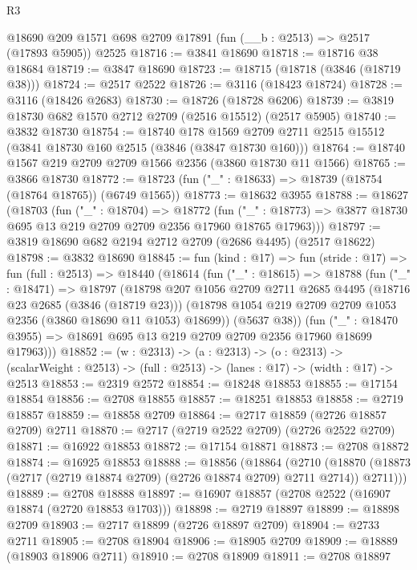\begin{lexlean}{R3}
\begin{coremodule}
    @18690
    @209
    @1571
    @698
    @2709
    @17891
    (fun (__b : @2513) => @2517 (@17893 @5905))
    @2525
@18716 := @3841 @18690
@18718 := @18716 @38 @18684
@18719 := @3847 @18690
@18723 := @18715 (@18718 (@3846 (@18719 @38)))
@18724 := @2517 @2522
@18726 := @3116 (@18423 @18724)
@18728 := @3116 (@18426 @2683)
@18730 := @18726 (@18728 @6206)
@18739 := @3819 @18730 @682 @1570 @2712 @2709 (@2516 @15512) (@2517 @5905)
@18740 := @3832 @18730
@18754 := @18740
    @178
    @1569
    @2709
    @2711
    @2515
    @15512
    (@3841 @18730 @160 @2515 (@3846 (@3847 @18730 @160)))
@18764 := @18740 @1567 @219 @2709 @2709 @1566 @2356 (@3860 @18730 @11 @1566)
@18765 := @3866 @18730
@18772 := @18723 (fun ("_" : @18633) => @18739 (@18754 (@18764 @18765)) (@6749 @1565))
@18773 := @18632 @3955
@18788 := @18627
    (@18703
      (fun ("_" : @18704) =>
      @18772
        (fun ("_" : @18773) => @3877 @18730 @695 @13 @219 @2709 @2709 @2356 @17960 @18765 @17963)))
@18797 := @3819 @18690 @682 @2194 @2712 @2709 (@2686 @4495) (@2517 @18622)
@18798 := @3832 @18690
@18845 := fun (kind : @17) =>
  fun (stride : @17) =>
  fun (full : @2513) =>
  @18440
    (@18614
      (fun ("_" : @18615) =>
      @18788
        (fun ("_" : @18471) =>
        @18797
          (@18798
            @207
            @1056
            @2709
            @2711
            @2685
            @4495
            (@18716 @23 @2685 (@3846 (@18719 @23)))
            (@18798 @1054 @219 @2709 @2709 @1053 @2356 (@3860 @18690 @11 @1053) @18699))
          (@5637 @38))
        (fun ("_" : @18470 @3955) => @18691 @695 @13 @219 @2709 @2709 @2356 @17960 @18699 @17963)))
@18852 := (w : @2313) ->
  (a : @2313) ->
  (o : @2313) -> (scalarWeight : @2513) -> (full : @2513) -> (lanes : @17) -> (width : @17) -> @2513
@18853 := @2319 @2572
@18854 := @18248 @18853
@18855 := @17154 @18854
@18856 := @2708 @18855
@18857 := @18251 @18853
@18858 := @2719 @18857
@18859 := @18858 @2709
@18864 := @2717 @18859 (@2726 @18857 @2709) @2711
@18870 := @2717 (@2719 @2522 @2709) (@2726 @2522 @2709)
@18871 := @16922 @18853
@18872 := @17154 @18871
@18873 := @2708 @18872
@18874 := @16925 @18853
@18888 := @18856
    (@18864
      (@2710 (@18870 (@18873 (@2717 (@2719 @18874 @2709) (@2726 @18874 @2709) @2711 @2714)) @2711)))
@18889 := @2708 @18888
@18897 := @16907 @18857 (@2708 @2522 (@16907 @18874 (@2720 @18853 @1703)))
@18898 := @2719 @18897
@18899 := @18898 @2709
@18903 := @2717 @18899 (@2726 @18897 @2709)
@18904 := @2733 @2711
@18905 := @2708 @18904
@18906 := @18905 @2709
@18909 := @18889 (@18903 @18906 @2711)
@18910 := @2708 @18909
@18911 := @2708 @18897

\end{coremodule}
\end{lexlean}
